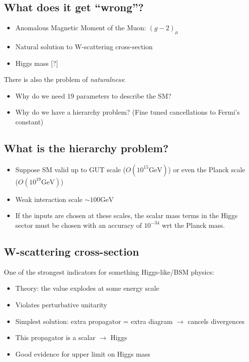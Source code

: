 \documentclass{beamer}
\begin{document}
\subsection{What does it get ``wrong''?}
\begin{frame}{\insertsubsection}
  \begin{itemize}
    \item Anomalous Magnetic Moment of the Muon: $(g-2)_{\mu}$
    \item Natural solution to W-scattering cross-section
    \item Higgs mass \alert{[?]}
  \end{itemize}
  There is also the problem of \textit{naturalness}:
  \begin{itemize}
    \item Why do we need 19 parameters to describe the SM?
    \item Why do we have a hierarchy problem? (Fine tuned cancellations to
    Fermi's constant)
  \end{itemize}
\end{frame}

\subsection{What is the hierarchy problem?}
\begin{frame}{\insertsubsection}
  \begin{itemize}
    \item Suppose SM valid up to GUT scale ($O(10^{15}\textrm{GeV})$) or even
    the Planck scale ($O(10^{19}\textrm{GeV})$)
    \item Weak interaction scale $\sim100\textrm{GeV}$
    \item If the inputs are chosen at these scales, the scalar mass terms in
    the Higgs sector must be chosen with an accuracy of $10^{-34}$ wrt the
    Planck mass.
  \end{itemize}
\end{frame}

\subsection{W-scattering cross-section}
\begin{frame}{\insertsubsection}
  One of the strongest indicators for something Higgs-like/BSM physics:
  \begin{itemize}
    \item Theory: the value explodes at some energy scale
    \item Violates perturbative unitarity
    \item Simplest solution: extra propagator = extra diagram $\rightarrow$
    cancels divergences
    \item This propagator is a scalar $\rightarrow$ Higgs
    \item Good evidence for upper limit on Higgs mass
  \end{itemize}
\end{frame}
\end{document}
